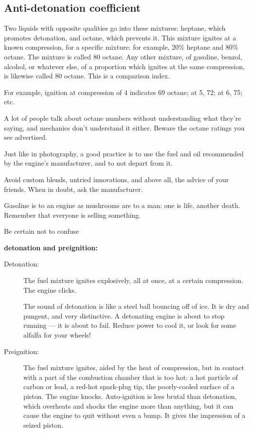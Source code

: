 \documentclass{book}
\begin{document}
\subsection{Anti-detonation coefficient} %

Two liquids with opposite qualities go into these mixtures: heptane,
which promotes detonation, and octane, which prevents it.  This
mixture ignites at a known compression, for a specific mixture: for
example, 20\% heptane and 80\% octane.  The mixture is called 80
octane.  Any other mixture, of gasoline, benzol, alcohol, or whatever
else, of a proportion which ignites at the same compression, is
likewise called 80 octane.  This is a comparison index.

For example, ignition at compression of 4 indicates 69 octane; at 5,
72; at 6, 75; etc.

A lot of people talk about octane numbers without understanding what
they're saying, and mechanics don't understand it either.  Beware the
octane ratings you see advertised.

Just like in photography, a good practice is to use the fuel and oil
recommended by the engine's manufacturer, and to not depart from it.

Avoid custom blends, untried innovations, and above all, the advice of
your friends.  When in doubt, ask the manufacturer.

Gasoline is to an engine as mushrooms are to a man: one is life,
another death.  Remember that everyone is selling something.

Be certain not to confuse

\begin{center}\textbf{detonation and preignition:}\end{center}

\begin{description}
\item[Detonation:]{

  The fuel mixture ignites explosively, all at once, at a certain
  compression.  The engine clicks.

  The sound of detonation is like a steel ball bouncing off of ice.
  It is dry and pungent, and very distinctive.  A detonating engine is
  about to stop running --- it is about to fail.  Reduce power to cool
  it, or look for some alfalfa for your wheels!
}
\item[Preignition:]{
  
  The fuel mixture ignites, aided by the heat of compression, but in
  contact with a part of the combustion chamber that is too hot: a hot
  particle of carbon or lead, a red-hot spark-plug tip, the
  poorly-cooled surface of a piston.  The engine knocks.
  Auto-ignition is less brutal than detonation, which overheats and
  shocks the engine more than anything, but it can cause the engine to
  quit without even a bump.  It gives the impression of a seized
  piston.}

\end{description}
\end{document}
